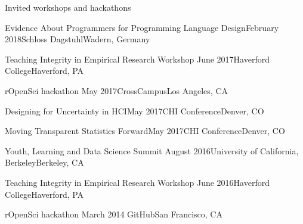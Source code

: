 \documentclass{resume} %
\begin{document}
\begin{rSection}{Invited workshops and hackathons}

\begin{sSubsection}{Evidence About Programmers for Programming Language Design}{}{February 2018}{Schloss Dagstuhl}{Wadern, Germany}
\end{sSubsection}

\begin{sSubsection}{Teaching Integrity in Empirical Research Workshop}{ }{June 2017}{Haverford College}{Haverford, PA}
\end{sSubsection}

\begin{sSubsection}{rOpenSci hackathon}{ }{May 2017}{CrossCampus}{Los Angeles, CA}
\end{sSubsection}

\begin{sSubsection}{Designing for Uncertainty in HCI}{}{May 2017}{CHI Conference}{Denver, CO}
\end{sSubsection}

\begin{sSubsection}{Moving Transparent Statistics Forward}{}{May 2017}{CHI Conference}{Denver, CO}
\end{sSubsection}

\begin{sSubsection}{Youth, Learning and Data Science Summit}{ }{August 2016}{University of California, Berkeley}{Berkeley, CA}
\end{sSubsection}

\begin{sSubsection}{Teaching Integrity in Empirical Research Workshop}{ }{June 2016}{Haverford College}{Haverford, PA}
\end{sSubsection}

\begin{sSubsection}{rOpenSci hackathon}{ }{March 2014}{ GitHub}{San Francisco, CA}
\end{sSubsection}


\end{rSection}

\end{document}
